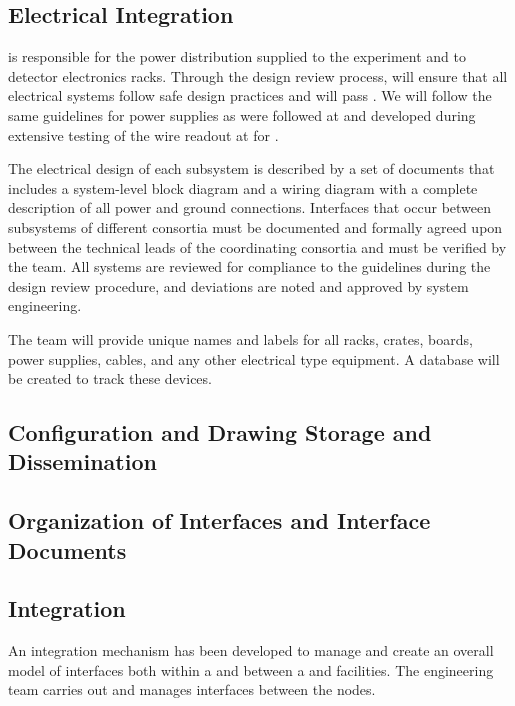 \subsection{Electrical Integration}
\label{sec:es-tc-elec}

 is responsible for the  power
distribution supplied to the experiment and to detector electronics
racks.  Through the design review process,  will  ensure 
that all electrical systems  follow safe design practices and
will pass . We will follow the same  guidelines\cite{bib:cernedms2095958} for  power supplies as
were followed at  and developed during extensive testing of
the  wire readout at  for .  

The electrical design of each subsystem is described by a set of
documents that includes a system-level block diagram and a wiring
diagram with a complete description of all power and ground
connections. Interfaces that occur between subsystems of different consortia must be documented and formally agreed upon between the technical leads of the coordinating 
consortia and must be verified by the  team.  All systems are reviewed for compliance to the guidelines during the design review procedure, and deviations  are noted and approved by system engineering. 

The  team will provide unique names and labels
for all racks, crates, boards, power supplies, cables, and any other
electrical type equipment.  A database will be created to track these
devices.

\subsection{Configuration and Drawing Storage and Dissemination}
\subsection{Organization of Interfaces and Interface Documents}

\subsection{Integration}
\label{sec:es-tc-integ}

 An integration mechanism has been developed to manage and create an overall model of interfaces both within a  and between a  and facilities.
 The  engineering team carries out  and manages interfaces between the nodes.

